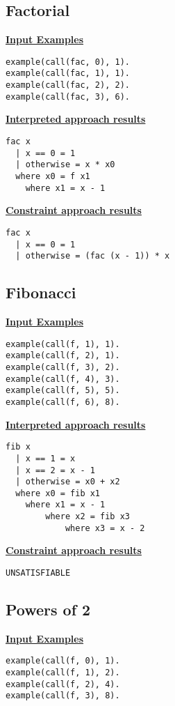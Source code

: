 \subsection{Factorial}
\underline{\textbf{Input Examples}}
\begin{lstlisting}
example(call(fac, 0), 1).
example(call(fac, 1), 1).
example(call(fac, 2), 2).
example(call(fac, 3), 6).
\end{lstlisting}

\begin{multicols}{2}

\underline{\textbf{Interpreted approach results}}

\begin{lstlisting}
fac x
  | x == 0 = 1
  | otherwise = x * x0
  where x0 = f x1
  	where x1 = x - 1
\end{lstlisting}
\columnbreak
\underline{\textbf{Constraint approach results}}
\begin{lstlisting}
fac x
  | x == 0 = 1
  | otherwise = (fac (x - 1)) * x
\end{lstlisting}
\end{multicols}

\subsection{Fibonacci}
\underline{\textbf{Input Examples}}
\begin{lstlisting}
example(call(f, 1), 1).
example(call(f, 2), 1).
example(call(f, 3), 2).
example(call(f, 4), 3).
example(call(f, 5), 5).
example(call(f, 6), 8).
\end{lstlisting}

\begin{multicols}{2}
\underline{\textbf{Interpreted approach results}}
\begin{lstlisting}
fib x
  | x == 1 = x
  | x == 2 = x - 1
  | otherwise = x0 + x2
  where x0 = fib x1
  	where x1 = x - 1
  		where x2 = fib x3
  			where x3 = x - 2
\end{lstlisting}
\columnbreak
\underline{\textbf{Constraint approach results}}
\begin{lstlisting}
UNSATISFIABLE
\end{lstlisting}
\end{multicols}

\pagebreak
\subsection{Powers of 2}
\underline{\textbf{Input Examples}}
\begin{lstlisting}
example(call(f, 0), 1).
example(call(f, 1), 2).
example(call(f, 2), 4).
example(call(f, 3), 8).
\end{lstlisting}

